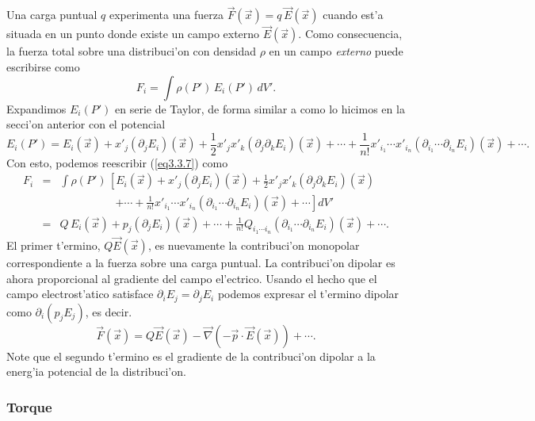 Una carga puntual $q$ experimenta una fuerza
$\vec{F}(\vec{x})=q\,\vec{E}(\vec{x})$ cuando est'a situada en
un punto donde existe un campo externo $\vec{E}(\vec{x})$. Como consecuencia,
la fuerza total sobre una distribuci'on con densidad $\rho$ en un campo
\textit{externo} puede escribirse como
\begin{equation} \label{eq3.3.7}
F_i=\int \rho(P')\,E_i(P')\,dV'.
\end{equation}
Expandimos $E_i(P')$ en serie de Taylor, de forma similar a como lo
hicimos en la secci'on anterior con el potencial
\begin{equation} \label{eq3.3.7.1}
E_i(P')=E_i(\vec{x})+x'_j(\partial_jE_i)(\vec{x})+\frac{1}{
2}x'_jx'_k(\partial_j\partial_kE_i)(\vec{x})
+\cdots+\frac{1}{n!}x'_{i_1}\cdots
x'_{i_n}(\partial_{i_1}\cdots\partial_{i_n}E_i)(\vec {x})+\cdots .
\end{equation}
Con esto, podemos reescribir (\ref{eq3.3.7}) como
\begin{eqnarray}
F_i&=& \int
\rho(P')\,\left[E_i(\vec{x})+x'_j(\partial_jE_i)(\vec{x})+\frac{1}{
2}x'_jx'_k(\partial_j\partial_kE_i)(\vec{x}) \right.\nonumber\\
&& \quad\qquad\qquad \left. +\cdots+\frac{1}{n!}x'_{i_1}\cdots
x'_{i_n}(\partial_{i_1}\cdots\partial_{i_n}E_i)(\vec {x})+\cdots\right] dV' \\
&=&
Q\,E_i(\vec{x})+p_j(\partial_jE_i)(\vec{x})+\cdots+\frac{1}{n!}Q_{i_1\cdots i_n}
(\partial_{i_1}\cdots\partial_{i_n}E_i)(\vec {x})+\cdots .\label{eq3.3.8}
\end{eqnarray}
El primer t'ermino, $Q\vec{E}(\vec{x})$, es nuevamente la contribuci'on monopolar correspondiente a la fuerza sobre una carga puntual. La contribuci'on
dipolar es ahora proporcional al gradiente del campo el'ectrico. Usando el hecho que el campo electrost'atico satisface
$\partial_iE_j=\partial_jE_i$ podemos expresar el t'ermino dipolar como $\partial_i(p_jE_j)$,
es decir.
\begin{equation} \label{eq3.3.12}
\boxed{\vec{F}(\vec{x}) =
Q\vec{E}(\vec{x})-\vec{\nabla}\left(-\vec{p}\cdot\vec{E}(\vec{x})\right)+\cdots.
}
\end{equation}
Note que el segundo t'ermino es el gradiente de la contribuci'on dipolar a la
energ'ia potencial de la distribuci'on.

\subsubsection{Torque}  \label{ed3_3_3}

